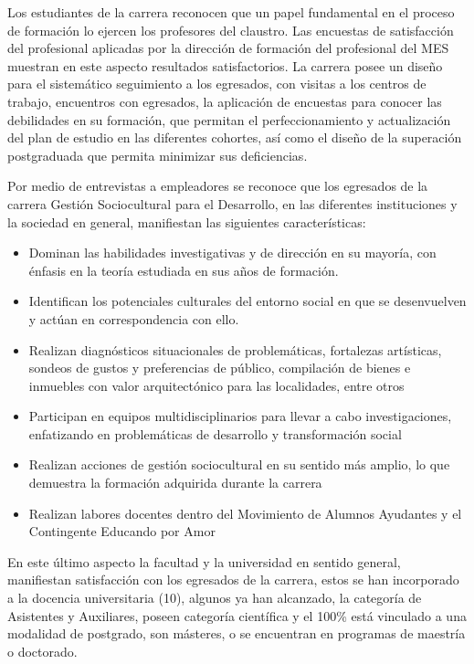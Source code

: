 Los estudiantes de la carrera reconocen que un papel fundamental en el proceso de formación lo ejercen los profesores del claustro. Las encuestas de satisfacción del profesional aplicadas por la dirección de formación del profesional del MES muestran en este aspecto resultados satisfactorios. La carrera posee un diseño para el sistemático seguimiento a los egresados, con visitas a los centros de trabajo, encuentros con egresados, la aplicación de encuestas para conocer las debilidades en su formación, que permitan el perfeccionamiento y actualización del plan de estudio en las diferentes cohortes, así como el diseño de la superación postgraduada que permita minimizar sus deficiencias.  

Por medio de entrevistas a empleadores se reconoce que los egresados de la carrera Gestión Sociocultural para el Desarrollo, en las diferentes instituciones y la sociedad en general, manifiestan las siguientes características: 

\begin{itemize}
	\setlength\itemsep{-0.5em}
	\item Dominan las habilidades investigativas y de dirección en su mayoría, con énfasis en la teoría estudiada en sus años de formación.
	\item Identifican los potenciales culturales del entorno social en que se desenvuelven y actúan en correspondencia con ello.
	\item Realizan diagnósticos situacionales de problemáticas, fortalezas artísticas, sondeos de gustos y preferencias de público, compilación de bienes e inmuebles con valor arquitectónico para las localidades, entre otros
	\item Participan en equipos multidisciplinarios para llevar a cabo investigaciones, enfatizando en problemáticas de desarrollo y transformación social
	\item Realizan acciones de gestión sociocultural en su sentido más amplio, lo que demuestra la formación adquirida durante la carrera
	\item Realizan labores docentes dentro del Movimiento de Alumnos Ayudantes y el Contingente Educando por Amor
\end{itemize}

En este último aspecto la facultad y la universidad en sentido general, manifiestan satisfacción con los egresados de la carrera, estos se han incorporado a la docencia universitaria (10), algunos ya han alcanzado, la categoría de Asistentes y Auxiliares, poseen categoría científica y el 100\% está vinculado a una modalidad de postgrado, son másteres, o se encuentran en programas de maestría o doctorado.

